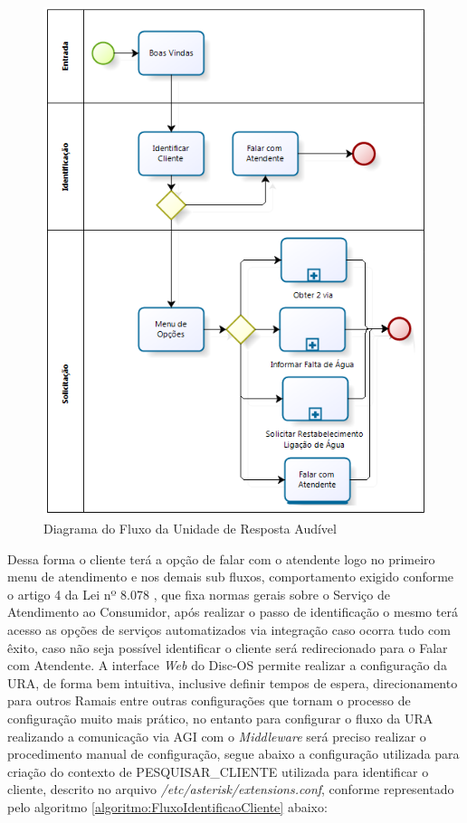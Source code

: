 \begin{figure}[H]
	\centering
	\caption{Diagrama do Fluxo da Unidade de Resposta Audível}
	\label{figura:fluxoURA}	
	\includegraphics{figuras/fluxo_ura.png}
\end{figure}


Dessa forma o cliente terá a opção de falar com o atendente logo no primeiro menu de atendimento e nos demais sub fluxos, comportamento exigido conforme o artigo 4 da Lei nº 8.078 \cite{leiAtendimentoAoConsumidor}, que fixa normas gerais sobre o Serviço de Atendimento ao Consumidor, após realizar o passo de identificação o mesmo terá acesso as opções de serviços automatizados via integração caso ocorra tudo com êxito, caso não seja possível identificar o cliente será redirecionado para o Falar com Atendente.
A interface \textit{Web} do Disc-OS permite realizar a configuração da URA, de forma bem intuitiva, inclusive definir tempos de espera, direcionamento para outros Ramais entre outras configurações que tornam o processo de configuração muito mais prático, no entanto para configurar o fluxo da URA realizando a comunicação via AGI com o \textit{Middleware} será preciso realizar o procedimento manual de configuração, segue abaixo a configuração utilizada para criação do contexto de PESQUISAR\_CLIENTE utilizada para identificar o cliente, descrito no arquivo \textit{/etc/asterisk/extensions.conf}, conforme representado pelo algoritmo \ref{algoritmo:FluxoIdentificaoCliente} abaixo:


